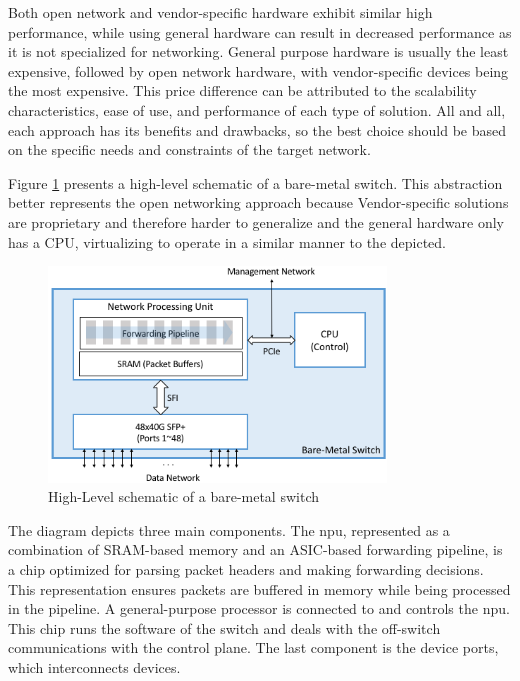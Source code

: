 Both open network and vendor-specific hardware exhibit similar high performance, while using general hardware can result in decreased performance as it is not specialized for networking. General purpose hardware is usually the least expensive, followed by open network hardware, with vendor-specific devices being the most expensive. This price difference can be attributed to the scalability characteristics, ease of use, and performance of each type of solution. All and all, each approach has its benefits and drawbacks, so the best choice should be based on the specific needs and constraints of the target network.

Figure \ref{fig:switch_schematic} presents a high-level schematic of a bare-metal switch. This abstraction better represents the open networking approach because Vendor-specific solutions are proprietary and therefore harder to generalize and the general hardware only has a CPU, virtualizing to operate in a similar manner to the depicted.

\begin{figure}
	\centering
	\includegraphics[width=0.8\textwidth]{Chapters/Figures/SDNs/switch_schematic.png}
	\caption{High-Level schematic of a bare-metal switch\cite{peterson_software-defined_2021}}
	\label{fig:switch_schematic}
\end{figure}

The diagram depicts three main components. The \gls{npu}, represented as a combination of SRAM-based memory and an ASIC-based forwarding pipeline, is a chip optimized for parsing packet headers and making forwarding decisions. This representation ensures packets are buffered in memory while being processed in the pipeline. A general-purpose processor is connected to and controls the \gls{npu}. This chip runs the software of the switch and deals with the off-switch communications with the control plane. The last component is the device ports, which interconnects devices.

